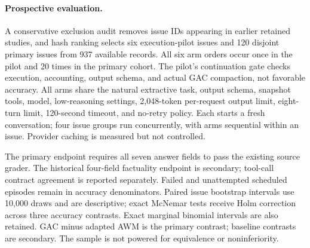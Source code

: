 \paragraph{Prospective evaluation.}
A conservative exclusion audit removes issue IDs appearing in earlier retained
studies, and hash ranking selects six execution-pilot issues and 120 disjoint
primary issues from 937 available records. All six arm orders occur once in the
pilot and 20 times in the primary cohort. The pilot's continuation gate checks
execution, accounting, output schema, and actual GAC compaction, not favorable
accuracy. All arms share the natural extractive task, output schema, snapshot
tools, model, low-reasoning settings, 2,048-token per-request output limit,
eight-turn limit, 120-second timeout, and no-retry policy. Each starts a fresh
conversation; four issue groups run concurrently, with arms sequential within
an issue. Provider caching is measured but not controlled.

The primary endpoint requires all seven answer fields to pass the existing
source grader. The historical four-field factuality endpoint is secondary;
tool-call contract agreement is reported separately. Failed and unattempted
scheduled episodes remain in accuracy denominators. Paired issue bootstrap
intervals use 10,000 draws and are descriptive; exact McNemar tests receive Holm
correction across three accuracy contrasts. Exact marginal binomial intervals
are also retained. GAC minus adapted AWM is the primary contrast; baseline contrasts are secondary.
The sample is not powered for equivalence or noninferiority.

\begin{table}[t]
  \centering
  \caption{Primary comparison on 120 fresh issue groups. Correct is the
  seven-field endpoint; factual is the historical four-field endpoint.
  Requests and tools are observed calls per attempted episode; USD/1k is
  estimated deployment-model cost per 1,000 attempted episodes, excluding
  one-time induction. This is an adapted AWM API-task comparison.}
  \label{tab:matched-reuse}
  \small
  
\end{table}


